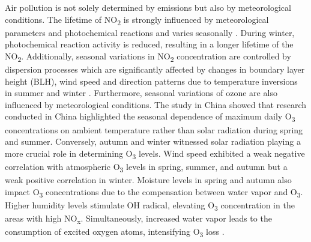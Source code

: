 Air pollution is not solely determined by emissions but also by meteorological conditions. The lifetime of NO\textsubscript{2} is strongly influenced by meteorological parameters and photochemical reactions \citep{barre2021estimating} and varies seasonally \citep{dragomir2015modeling,kendrick2015diurnal}. During winter, photochemical reaction activity is reduced, resulting in a longer lifetime of the NO\textsubscript{2}. Additionally, seasonal variations in NO\textsubscript{2} concentration are controlled by dispersion processes which are significantly affected by changes in boundary layer height (BLH), wind speed and direction patterns due to temperature inversions in summer and winter \citep{barre2021estimating,kendrick2015diurnal}. Furthermore, seasonal variations of ozone are also influenced by meteorological conditions. The study in China showed that research conducted in China highlighted the seasonal dependence of maximum daily O\textsubscript{3} concentrations on ambient temperature rather than solar radiation during spring and summer. Conversely, autumn and winter witnessed solar radiation playing a more crucial role in determining O\textsubscript{3} levels. Wind speed exhibited a weak negative correlation with atmospheric O\textsubscript{3} levels in spring, summer, and autumn but a weak positive correlation in winter. Moisture levels in spring and autumn also impact O\textsubscript{3} concentrations due to the compensation between water vapor and O\textsubscript{3}. Higher humidity levels stimulate OH radical, elevating O\textsubscript{3} concentration in the areas with high NO\textsubscript{x}. Simultaneously, increased water vapor leads to the consumption of excited oxygen atoms, intensifying O\textsubscript{3} loss \citep{yu2021review}. \par
